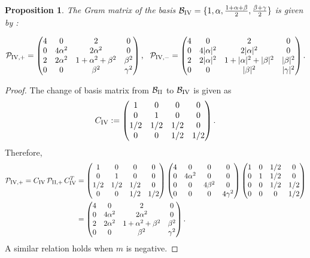 \documentclass[table]{amsart}
\newtheorem{proposition}[theorem]{Proposition}
\numberwithin{equation}{section}
\begin{document}
\begin{proposition}\label{12 propn}
The Gram matrix of the basis $\mathcal{B}_{\rm{IV}} = \{1,\alpha,\frac{1 + \alpha +\beta}{2}, \frac{\beta + \gamma}{2} \}$ is given by :

$$
\mathcal{P}_{\rm{IV}, +}=  
\begin{pmatrix} 
4 & 0 & 2 & 0 \\
0 & 4\alpha^2 & 2\alpha^2 & 0 \\
2 & 2\alpha^2 & 1 + \alpha^2 + \beta^2 & \beta^2 \\
0 & 0 & \beta^2 & \gamma^2 
\end{pmatrix}, \ \
\mathcal{P}_{\rm{IV}, -}= 
\begin{pmatrix} 
4 & 0 & 2 & 0 \\
0 & 4|\alpha|^2 & 2|\alpha|^2 & 0 \\
2 & 2|\alpha|^2 & 1 + |\alpha|^2 + |\beta|^2 & |\beta|^2 \\
0 & 0 & |\beta|^2 & |\gamma|^2 
\end{pmatrix}.
$$
\end{proposition}
\begin{proof}
    The change of basis matrix from $\mathcal{B}_{\rm{II}}$ to $\mathcal{B}_{\rm{IV}}$ is given as
    $$
    C_{\rm{IV}}:= 
    \begin{pmatrix}
1 & 0 & 0 & 0 \\
0 & 1 & 0 & 0 \\
1/2 & 1/2 & 1/2 & 0 \\
0 & 0 & 1/2 & 1/2
\end{pmatrix}.
    $$
    Therefore,
     \begin{align*}
    \mathcal{P}_{\rm{IV}, +}= C_{\rm{IV}} \, \mathcal{P}_{\rm{II}, +} \, C_{\rm{IV}}^T &= 
     \begin{pmatrix}
1 & 0 & 0 & 0 \\
0 & 1 & 0 & 0 \\
1/2 & 1/2 & 1/2 & 0 \\
0 & 0 & 1/2 & 1/2
\end{pmatrix}
\begin{pmatrix}
4 & 0 & 0 & 0 \\
0 & 4\alpha^2 & 0 & 0 \\
0 & 0 & 4\beta^2 & 0 \\
0 & 0 & 0 & 4\gamma^2
\end{pmatrix}
 \begin{pmatrix}
1 & 0 & 1/2 & 0 \\
0 & 1 & 1/2 & 0 \\
0 & 0 & 1/2 &  1/2 \\
0 & 0 & 0 & 1/2
\end{pmatrix} \\ 
&= \begin{pmatrix} 4 & 0 & 2 & 0 \\ 0 & 4\alpha^2 & 2\alpha^2 & 0 \\ 2 & 2\alpha^2 & 1 + \alpha^2 + \beta^2 & \beta^2 \\ 0 & 0 & \beta^2 & \gamma^2 \end{pmatrix}.
    \end{align*}
A similar relation holds when $m$ is negative.
\end{proof}
\end{document}
